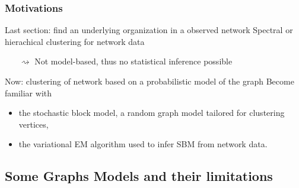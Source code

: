 \documentclass{beamer}\usepackage[]{graphicx}\usepackage[]{color}
\begin{document}
\begin{frame}
  \frametitle{Motivations}

  \begin{block}{Last section: \alert{find an underlying organization in a observed network}}
    Spectral or hierachical clustering for network data \\
    \begin{itemize}
      \item[$\rightsquigarrow$] \alert{Not model-based}, thus no statistical inference possible
    \end{itemize}
  \end{block}

  \begin{block}{Now: \alert{clustering of network based on a probabilistic model of the graph}}
    Become familiar with
    \begin{itemize}
      \item the stochastic block model, a random graph model tailored for clustering vertices,
      \item the variational EM algorithm used to infer SBM from network data.
    \end{itemize}
  \end{block}


\end{frame}

\subsection{Some Graphs Models and their limitations}
\end{document}
